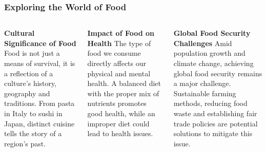 \documentclass[5pt]{beamer}
\begin{document}
\begin{frame}
\frametitle{Exploring the World of Food}
\begin{columns}
\begin{column}{0.3\textwidth}
\begin{block}{\textbf{Cultural Significance of Food}}
Food is not just a means of survival, it is a reflection of a culture's history, geography and traditions. From pasta in Italy to sushi in Japan, distinct cuisine tells the story of a region's past.
\end{block}
\end{column}
\begin{column}{0.3\textwidth}
\begin{block}{\textbf{Impact of Food on Health}}
The type of food we consume directly affects our physical and mental health. A balanced diet with the proper mix of nutrients promotes good health, while an improper diet could lead to health issues.
\end{block}
\end{column}
\begin{column}{0.3\textwidth}
\begin{block}{\textbf{Global Food Security Challenges}}
Amid population growth and climate change, achieving global food security remains a major challenge. Sustainable farming methods, reducing food waste and establishing fair trade policies are potential solutions to mitigate this issue.
\end{block}
\end{column}
\end{columns}
\end{frame}
\end{document}
